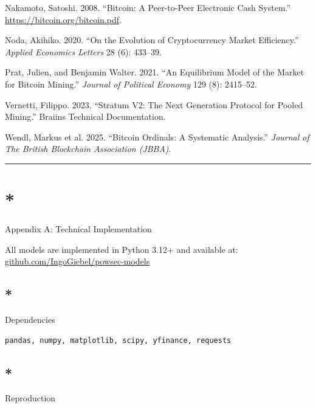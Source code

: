 \documentclass[
  11pt,
]{article}
\newlength{\cslhangindent}
\newlength{\cslentryspacingunit} %
\newenvironment{CSLReferences}[2] %
 {%
  \setlength{\parindent}{0pt}
  \ifodd #1
  \let\oldpar\par
  \def\par{\hangindent=\cslhangindent\oldpar}
  \fi
  \setlength{\parskip}{#2\cslentryspacingunit}
 }%
 {}
\let\oldsection\section
\renewcommand{\section}[1]{\FloatBarrier\oldsection{#1}}
\let\oldsubsection\subsection
\renewcommand{\subsection}[1]{\FloatBarrier\oldsubsection{#1}}
\begin{document}
\begin{CSLReferences}{1}{0}
\leavevmode{}%
Nakamoto, Satoshi. 2008. {``Bitcoin: A Peer-to-Peer Electronic Cash
System.''} \url{https://bitcoin.org/bitcoin.pdf}.

\leavevmode{}%
Noda, Akihiko. 2020. {``On the Evolution of Cryptocurrency Market
Efficiency.''} \emph{Applied Economics Letters} 28 (6): 433--39.

\leavevmode{}%
Prat, Julien, and Benjamin Walter. 2021. {``An Equilibrium Model of the
Market for {Bitcoin} Mining.''} \emph{Journal of Political Economy} 129
(8): 2415--52.

\leavevmode{}%
Vernetti, Filippo. 2023. {``Stratum {V2}: The Next Generation Protocol
for Pooled Mining.''} Braiins Technical Documentation.

\leavevmode{}%
Wendl, Markus et al. 2025. {``Bitcoin {Ordinals}: A Systematic
Analysis.''} \emph{Journal of The British Blockchain Association
(JBBA)}.

\end{CSLReferences}

\begin{center}\rule{0.5\linewidth}{0.5pt}\end{center}

\hypertarget{appendix-a-technical-implementation}{%
\section*{Appendix A: Technical
Implementation}\label{appendix-a-technical-implementation}}

All models are implemented in Python 3.12+ and available at:
\href{https://github.com/IngoGiebel/powsec-models}{github.com/IngoGiebel/powsec-models}

\hypertarget{dependencies}{%
\subsection*{Dependencies}\label{dependencies}}

\begin{verbatim}
pandas, numpy, matplotlib, scipy, yfinance, requests
\end{verbatim}

\hypertarget{reproduction}{%
\subsection*{Reproduction}\label{reproduction}}
\end{document}
